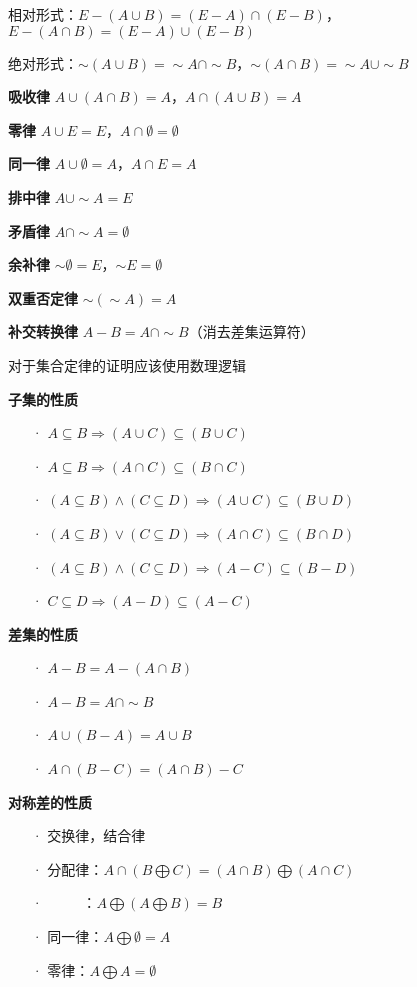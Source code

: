 	相对形式：$E - (A \cup B) = (E - A) \cap (E - B)$，$E - (A \cap B) = (E - A) \cup (E - B)$
	
	绝对形式：$\sim(A \cup B) = \sim A \cap \sim B$，$\sim(A \cap B) = \sim A \cup \sim B$
		
	\textbf{吸收律} $A \cup (A \cap B) = A$，$A \cap (A \cup B) = A$
	
	\textbf{零律} $A \cup E = E$，$A \cap \emptyset = \emptyset$
	
	\textbf{同一律} $A \cup \emptyset = A$，$A \cap E = A$
		
	\textbf{排中律} $A \cup \sim A = E$
	
	\textbf{矛盾律} $A \cap \sim A = \emptyset$
		
	\textbf{余补律} $\sim \emptyset = E$，$\sim E = \emptyset$
	
	\textbf{双重否定律} $\sim(\sim A) = A$
	
	\textbf{补交转换律} $A - B = A \cap \sim B$（消去差集运算符）
	
	对于集合定律的证明应该使用数理逻辑

	\textbf{子集的性质}
	\begin{itemize}
		\item[·] $A \subseteq B \Rightarrow (A \cup C) \subseteq (B \cup C)$
		\item[·] $A \subseteq B \Rightarrow (A \cap C) \subseteq (B \cap C)$
		\item[·] $(A \subseteq B) \wedge (C \subseteq D) \Rightarrow (A \cup C) \subseteq (B \cup D)$
		\item[·] $(A \subseteq B) \vee (C \subseteq D) \Rightarrow (A \cap C) \subseteq (B \cap D)$
		\item[·] $(A \subseteq B) \wedge (C \subseteq D) \Rightarrow (A - C) \subseteq (B - D)$
		\item[·] $C \subseteq D \Rightarrow (A - D) \subseteq (A - C)$
	\end{itemize}
	
	\textbf{差集的性质}
	\begin{itemize}
		\item[·] $A - B = A - (A \cap B)$
		\item[·] $A - B = A \cap \sim B$
		\item[·] $A \cup (B - A) = A \cup B$
		\item[·] $A \cap (B - C) = (A \cap B) - C$
	\end{itemize}
	
	\textbf{对称差的性质}
	\begin{itemize}
		\item[·] 交换律，结合律
		\item[·] 分配律：$A \cap (B \bigoplus C) = (A \cap B) \bigoplus (A \cap C)$
		\item[·] ~~~~~：$A \bigoplus (A \bigoplus B) = B$
		\item[·] 同一律：$A \bigoplus \emptyset = A$
		\item[·] 零律：$A \bigoplus A = \emptyset$
	\end{itemize}
	
